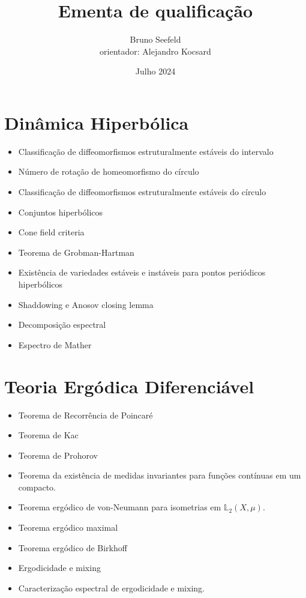 \documentclass{article}
\title{Ementa de qualificação}
\author{Bruno Seefeld\\
orientador: Alejandro Kocsard}
\date{Julho 2024}
\begin{document}
\maketitle


\section{Dinâmica Hiperbólica}

\begin{itemize}
    \item Classificação de diffeomorfismos estruturalmente estáveis do intervalo
    \item Número de rotação de homeomorfismo do círculo
    \item Classificação de diffeomorfismos estruturalmente estáveis do círculo
    \item Conjuntos hiperbólicos
    \item Cone field criteria
    \item Teorema de Grobman-Hartman
    \item Existência de variedades estáveis e instáveis para pontos periódicos hiperbólicos
    \item Shaddowing e Anosov closing lemma
    \item Decomposição espectral
    \item Espectro de Mather




\end{itemize}


\section{Teoria Ergódica Diferenciável}
\begin{itemize}
    \item Teorema de Recorrência de Poincaré
    \item Teorema de Kac 
    \item Teorema de Prohorov
    \item Teorema da existência de medidas invariantes para funções contínuas em um compacto.
    \item Teorema ergódico de von-Neumann para isometrias em $\mathbb{L}_2(X,\mu)$.
    \item Teorema ergódico maximal
    \item Teorema ergódico de Birkhoff
    \item Ergodicidade e mixing
    \item Caracterização espectral de ergodicidade e mixing.
\end{itemize}
\end{document}
